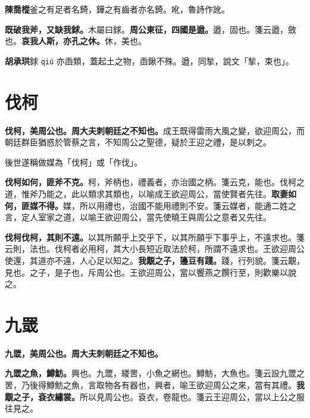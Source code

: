 \begin{quoting}\textbf{陳喬樅}釜之有足者名錡，鏵之有齒者亦名錡。吪，魯詩作訛。\end{quoting}

\textbf{既破我斧，又缺我銶。}{\footnotesize 木屬曰銶。}\textbf{周公東征，四國是遒。}{\footnotesize 遒，固也。箋云遒，斂也。}\textbf{哀我人斯，亦孔之休。}{\footnotesize 休，美也。}

\begin{quoting}\textbf{胡承珙}銶 \texttt{qiú} 亦臿類，蓋起土之物，臿鍬不殊。遒，同揫，說文「揫，束也」。\end{quoting}

\section{伐柯}


\textbf{伐柯，美周公也。周大夫刺朝廷之不知也。}{\footnotesize 成王既得雷雨大風之變，欲迎周公，而朝廷群臣猶惑於管蔡之言，不知周公之聖德，疑於王迎之禮，是以刺之。}

\begin{quoting}後世遂稱做媒為「伐柯」或「作伐」。\end{quoting}

\textbf{伐柯如何，匪斧不克。}{\footnotesize 柯，斧柄也，禮義者，亦治國之柄。箋云克，能也。伐柯之道，惟斧乃能之，此以類求其類也，以喻成王欲迎周公，當使賢者先往。}\textbf{取妻如何，匪媒不得。}{\footnotesize 媒，所以用禮也，治國不能用禮則不安。箋云媒者，能通二姓之言，定人室家之道，以喻王欲迎周公，當先使曉王與周公之意者又先往。}

\textbf{伐柯伐柯，其則不遠。}{\footnotesize 以其所願乎上交乎下，以其所願乎下事乎上，不遠求也。箋云則，法也。伐柯者必用柯，其大小長短近取法於柯，所謂不遠求也。王欲迎周公使還，其道亦不遠，人心足以知之。}\textbf{我覯之子，籩豆有踐。}{\footnotesize 踐，行列貌。箋云覯，見也。之子，是子也，斥周公也。王欲迎周公，當以饗燕之饌行至，則歡樂以說之。}

\section{九罭}


\textbf{九罭，美周公也。周大夫刺朝廷之不知也。}

\textbf{九罭之魚，鱒魴。}{\footnotesize 興也。九罭，緵罟，小魚之網也。鱒魴，大魚也。箋云設九罭之罟，乃後得鱒魴之魚，言取物各有器也，興者，喻王欲迎周公之來，當有其禮。}\textbf{我覯之子，袞衣繡裳。}{\footnotesize 所以見周公也。袞衣，卷龍也。箋云王迎周公，當以上公之服往見之。}

